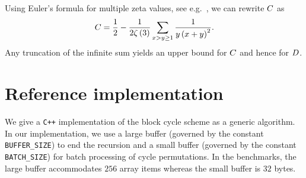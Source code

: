   \begin{remark}\label{rem.rewrite-c}
    Using Euler's formula for multiple
    zeta values, see e.g.\
    \cite[{p.\ 509, last display with $k=3$}]{MR1341859}, we can rewrite
     $C$ as 
    \begin{equation}\label{eq.const-c-alternative}
      \TheZetaConst
      =
      \frac{1}{2}
      -
      \frac{1}{2\ZetaOf{3}}
      \Sum[\substack{
        \LeftA>\RightA\geq 1
      }]{
        \frac{1}{\RightA\Parens{\LeftA+\RightA}^2}
      }
      .
    \end{equation}
    Any truncation of the infinite sum yields an upper bound
    for $C$ and hence for $D$.
  \end{remark}


  \section{Reference implementation}\label{sec.implementation}
  We give a \verb-C++- implementation of the block cycle scheme as
  a generic algorithm.
  In our implementation, we use a large buffer (governed by the constant
  \verb+BUFFER_SIZE+) to end the recursion and a small buffer (governed
  by the constant \verb+BATCH_SIZE+) for batch processing of cycle
  permutations. In the benchmarks, the large buffer accommodates
  $256$ array items whereas the small buffer is $32$ bytes.
  
